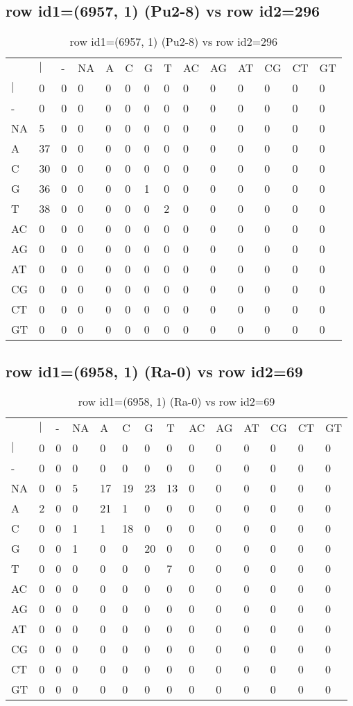 \subsection{row id1=(6957, 1) (Pu2-8) vs row id2=296}
\begin{center}
\begin{longtable}{|l|l|l|l|l|l|l|l|l|l|l|l|l|l|}
\caption{row id1=(6957, 1) (Pu2-8) vs row id2=296} \label{table_dm158}\\
\hline
\\
\hline
&$|$&-&NA&A&C&G&T&AC&AG&AT&CG&CT&GT\\
$|$&0&0&0&0&0&0&0&0&0&0&0&0&0\\
-&0&0&0&0&0&0&0&0&0&0&0&0&0\\
NA&5&0&0&0&0&0&0&0&0&0&0&0&0\\
A&37&0&0&0&0&0&0&0&0&0&0&0&0\\
C&30&0&0&0&0&0&0&0&0&0&0&0&0\\
G&36&0&0&0&0&1&0&0&0&0&0&0&0\\
T&38&0&0&0&0&0&2&0&0&0&0&0&0\\
AC&0&0&0&0&0&0&0&0&0&0&0&0&0\\
AG&0&0&0&0&0&0&0&0&0&0&0&0&0\\
AT&0&0&0&0&0&0&0&0&0&0&0&0&0\\
CG&0&0&0&0&0&0&0&0&0&0&0&0&0\\
CT&0&0&0&0&0&0&0&0&0&0&0&0&0\\
GT&0&0&0&0&0&0&0&0&0&0&0&0&0\\
\hline
\end{longtable}
\end{center}

\subsection{row id1=(6958, 1) (Ra-0) vs row id2=69}
\begin{center}
\begin{longtable}{|l|l|l|l|l|l|l|l|l|l|l|l|l|l|}
\caption{row id1=(6958, 1) (Ra-0) vs row id2=69} \label{table_dm160}\\
\hline
\\
\hline
&$|$&-&NA&A&C&G&T&AC&AG&AT&CG&CT&GT\\
$|$&0&0&0&0&0&0&0&0&0&0&0&0&0\\
-&0&0&0&0&0&0&0&0&0&0&0&0&0\\
NA&0&0&5&17&19&23&13&0&0&0&0&0&0\\
A&2&0&0&21&1&0&0&0&0&0&0&0&0\\
C&0&0&1&1&18&0&0&0&0&0&0&0&0\\
G&0&0&1&0&0&20&0&0&0&0&0&0&0\\
T&0&0&0&0&0&0&7&0&0&0&0&0&0\\
AC&0&0&0&0&0&0&0&0&0&0&0&0&0\\
AG&0&0&0&0&0&0&0&0&0&0&0&0&0\\
AT&0&0&0&0&0&0&0&0&0&0&0&0&0\\
CG&0&0&0&0&0&0&0&0&0&0&0&0&0\\
CT&0&0&0&0&0&0&0&0&0&0&0&0&0\\
GT&0&0&0&0&0&0&0&0&0&0&0&0&0\\
\hline
\end{longtable}
\end{center}

